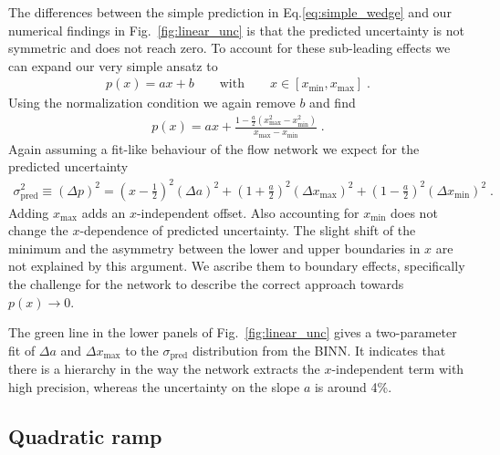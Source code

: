 The differences between the simple prediction in
Eq.\eqref{eq:simple_wedge} and our numerical findings in
Fig.~\ref{fig:linear_unc} is that the predicted uncertainty is not
symmetric and does not reach zero. To account for these sub-leading
effects we can expand our very simple ansatz to
%
\begin{align}
  p(x) = a  x + b
  \qquad \text{with} \qquad x \in [x_\text{min},x_\text{max}] \; .
\label{eq:fund_wedge}
\end{align}
%
Using the normalization condition we again remove $b$ and find
%
\begin{align}
  p(x)
  = a x
  +  \frac{ 1 - \frac{a}{2}(x_\text{max}^2 - x_\text{min}^2) }{ x_\text{max} - x_\text{min} } \; .
\end{align}
%
Again assuming a fit-like behaviour of the flow network we expect for
the predicted uncertainty
%
\begin{align}
\sigma_\text{pred}^2 \equiv (\Delta p)^2 =
    \left( x - \frac{1}{2} \right)^2 (\Delta a)^2
    + \left(1 + \frac{a}{2} \right)^2 (\Delta x_\text{max} )^2
    + \left(1 - \frac{a}{2} \right)^2 (\Delta x_\text{min} )^2 \; .
\label{eq:fit_wedge}
\end{align}
%
Adding $x_\text{max}$ adds an $x$-independent offset. Also accounting
for $x_\text{min}$ does not change the $x$-dependence of predicted
uncertainty. The slight shift of the minimum and the asymmetry between
the lower and upper boundaries in $x$ are not explained by this
argument.  We ascribe them to boundary effects, specifically the
challenge for the network to describe the correct approach towards
$p(x) \to 0$.

The green line in the lower panels of Fig.~\ref{fig:linear_unc} gives
a two-parameter fit of $\Delta a$ and $\Delta x_\text{max}$ to the
$\sigma_\text{pred}$ distribution from the BINN. It indicates that
there is a hierarchy in the way the network extracts the
$x$-independent term with high precision, whereas the uncertainty on
the slope $a$ is around 4\%.

\subsection{Quadratic ramp}
\label{sec:toy_kicker}

